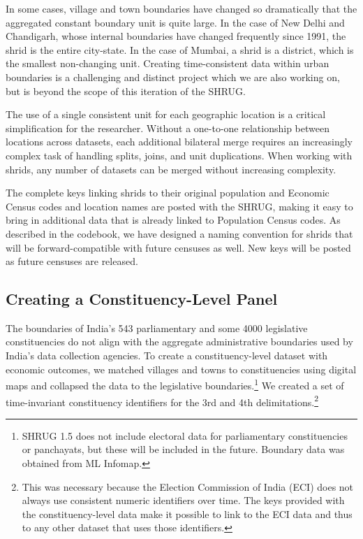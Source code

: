 \documentclass[12pt,letterpaper]{article}
\begin{document}
In some cases, village and town boundaries have changed so dramatically that the aggregated constant boundary unit is quite large. In the case of New Delhi and Chandigarh, whose internal boundaries have changed frequently since 1991, the shrid is the entire city-state. In the case of Mumbai, a shrid is a district, which is the smallest non-changing unit. Creating time-consistent data within urban boundaries is a challenging and distinct project which we are also working on, but is beyond the scope of this iteration of the SHRUG.

The use of a single consistent unit for each geographic location is a critical simplification for the researcher. Without a one-to-one relationship between locations across datasets, each additional bilateral merge requires an increasingly complex task of handling splits, joins, and unit duplications. When working with shrids, any number of datasets can be merged without increasing complexity.

The complete keys linking shrids to their original population and Economic Census codes and location names are posted with the SHRUG, making it easy to bring in additional data that is already linked to Population Census codes. As described in the codebook, we have designed a naming convention for shrids that will be forward-compatible with future censuses as well. New keys will be posted as future censuses are released.

\subsection*{Creating a Constituency-Level Panel}

The boundaries of India's 543 parliamentary and some 4000 legislative constituencies do not align with the aggregate administrative boundaries used by India's data collection agencies. To create a constituency-level dataset with economic outcomes, we matched villages and towns to constituencies using digital maps and collapsed the data to the legislative boundaries.\footnote{SHRUG 1.5 does not include electoral data for parliamentary constituencies or panchayats, but these will be included in the future. Boundary data was obtained from ML Infomap.} We created a set of time-invariant constituency identifiers for the 3rd and 4th delimitations.\footnote{This was necessary because the Election Commission of India (ECI) does not always use consistent numeric identifiers over time. The keys provided with the constituency-level data make it possible to link to the ECI data and thus to any other dataset that uses those identifiers.}
\end{document}
